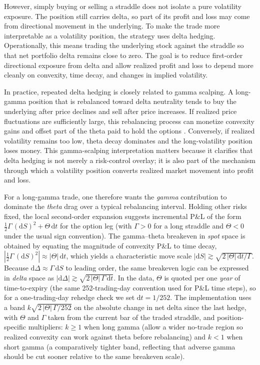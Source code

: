 ﻿\documentclass{article}
\begin{document}
However, simply buying or selling a straddle does not isolate a pure volatility exposure. The position still carries delta, so part of its profit and loss may come from directional movement in the underlying. To make the trade more interpretable as a volatility position, the strategy uses delta hedging. Operationally, this means trading the underlying stock against the straddle so that net portfolio delta remains close to zero. The goal is to reduce first-order directional exposure from delta and allow realized profit and loss to depend more cleanly on convexity, time decay, and changes in implied volatility.

In practice, repeated delta hedging is closely related to gamma scalping. A long-gamma position that is rebalanced toward delta neutrality tends to buy the underlying after price declines and sell after price increases. If realized price fluctuations are sufficiently large, this rebalancing process can monetize convexity gains and offset part of the theta paid to hold the options \cite{wilmott2006}. Conversely, if realized volatility remains too low, theta decay dominates and the long-volatility position loses money. This gamma-scalping interpretation matters because it clarifies that delta hedging is not merely a risk-control overlay; it is also part of the mechanism through which a volatility position converts realized market movement into profit and loss.

For a long-gamma trade, one therefore wants the \emph{gamma} contribution to dominate the \emph{theta} drag over a typical rebalancing interval. Holding other risks fixed, the local second-order expansion suggests incremental P\&L of the form $\tfrac{1}{2}\Gamma\,(\mathrm{d}S)^2+\Theta\,\mathrm{d}t$ for the option leg (with $\Gamma>0$ for a long straddle and $\Theta<0$ under the usual sign convention). The gamma--theta breakeven in \emph{spot} space is obtained by equating the magnitude of convexity P\&L to time decay, $|\tfrac{1}{2}\Gamma\,(\mathrm{d}S)^2|\approx |\Theta|\,\mathrm{d}t$, which yields a characteristic move scale $|\mathrm{d}S|\gtrsim \sqrt{2\,|\Theta|\,\mathrm{d}t/\Gamma}$. Because $\mathrm{d}\Delta\approx \Gamma\,\mathrm{d}S$ to leading order, the same breakeven logic can be expressed in \emph{delta} space as $|\mathrm{d}\Delta|\gtrsim \sqrt{2\,|\Theta|\,\Gamma\,\mathrm{d}t}$. In the data, $\Theta$ is quoted per one \emph{year} of time-to-expiry (the same 252-trading-day convention used for P\&L time steps), so for a one-trading-day rehedge check we set $\mathrm{d}t=1/252$. The implementation uses a band $k\sqrt{2\,|\Theta|\,\Gamma/252}$ on the absolute change in net delta since the last hedge, with $\Theta$ and $\Gamma$ taken from the current bar of the traded straddle, and position-specific multipliers: $k\ge 1$ when long gamma (allow a wider no-trade region so realized convexity can work against theta before rebalancing) and $k<1$ when short gamma (a comparatively tighter band, reflecting that adverse gamma should be cut sooner relative to the same breakeven scale).
\end{document}
